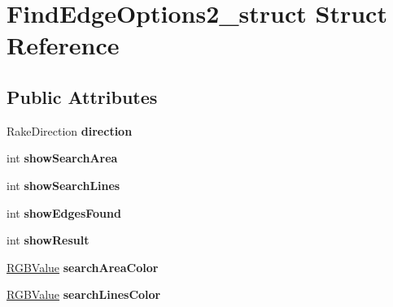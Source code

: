 \hypertarget{structFindEdgeOptions2__struct}{
\section{FindEdgeOptions2\_\-struct Struct Reference}
\label{structFindEdgeOptions2__struct}
}
\subsection*{Public Attributes}
\begin{DoxyCompactItemize}
\item 
\hypertarget{structFindEdgeOptions2__struct_aa383f773103ee925094c5a628788f628}{
RakeDirection {\bfseries direction}}
\label{structFindEdgeOptions2__struct_aa383f773103ee925094c5a628788f628}

\item 
\hypertarget{structFindEdgeOptions2__struct_a78f45ad569722c7c5b22667546f5feae}{
int {\bfseries showSearchArea}}
\label{structFindEdgeOptions2__struct_a78f45ad569722c7c5b22667546f5feae}

\item 
\hypertarget{structFindEdgeOptions2__struct_a95f56da94c39ed10ab235ab591db5b5f}{
int {\bfseries showSearchLines}}
\label{structFindEdgeOptions2__struct_a95f56da94c39ed10ab235ab591db5b5f}

\item 
\hypertarget{structFindEdgeOptions2__struct_a11623b0867857bdc0a7751dd29441416}{
int {\bfseries showEdgesFound}}
\label{structFindEdgeOptions2__struct_a11623b0867857bdc0a7751dd29441416}

\item 
\hypertarget{structFindEdgeOptions2__struct_abb8ff9298cbb0c3ff5d1e740e8c6e590}{
int {\bfseries showResult}}
\label{structFindEdgeOptions2__struct_abb8ff9298cbb0c3ff5d1e740e8c6e590}

\item 
\hypertarget{structFindEdgeOptions2__struct_ab70e7baf7a8c3046ca7b70cf56741d7e}{
\hyperlink{structRGBValue__struct}{RGBValue} {\bfseries searchAreaColor}}
\label{structFindEdgeOptions2__struct_ab70e7baf7a8c3046ca7b70cf56741d7e}

\item 
\hypertarget{structFindEdgeOptions2__struct_ac044bfa5205a5884aea0f7815dd8022e}{
\hyperlink{structRGBValue__struct}{RGBValue} {\bfseries searchLinesColor}}
\label{structFindEdgeOptions2__struct_ac044bfa5205a5884aea0f7815dd8022e}


\end{DoxyCompactItemize}
